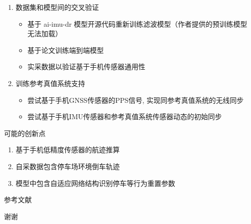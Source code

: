 \documentclass{beamer} %
\begin{document}
\begin{frame}
    \begin{enumerate}
        \item 数据集和模型间的交叉验证
        \begin{itemize}
            \item 基于 ai-imu-dr 模型开源代码重新训练滤波模型（作者提供的预训练模型无法加载）
            \item 基于论文\cite{dugne2021understanding}训练端到端模型
            \item 实采数据以验证基于手机传感器通用性
        \end{itemize}

        \item 训练参考真值系统支持
        \begin{itemize}
            \item 尝试基于手机GNSS传感器的PPS信号, 实现同参考真值系统的无线同步
            \item 尝试基于手机IMU传感器和参考真值系统传感器动态的初始同步
        \end{itemize}
    \end{enumerate}
\end{frame}

\begin{frame}{可能的创新点}
    \begin{enumerate}
        \item 基于手机低精度传感器的航迹推算
        \item 自采数据包含停车场环境倒车轨迹
        \item 模型中包含自适应网络结构识别停车等行为重置参数
    \end{enumerate}
\end{frame}


\begin{frame}[allowframebreaks]{参考文献} %
	\printbibliography[heading=references]
\end{frame}


\begin{frame}
    \begin{center}
        {\Huge 谢谢}
    \end{center}
\end{frame}
\end{document}
